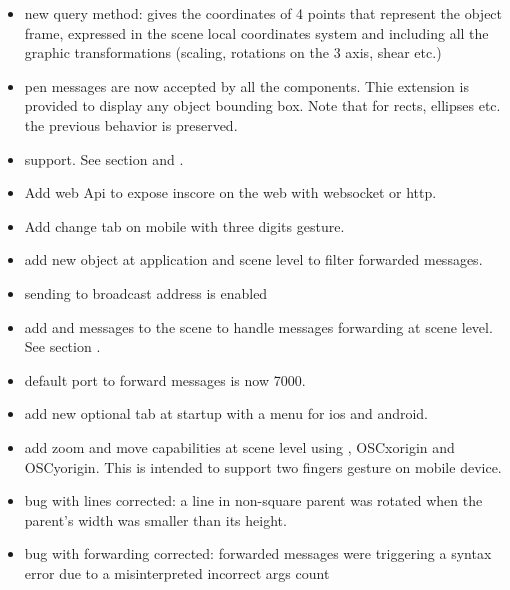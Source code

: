 \begin{itemize}
\item new  query method:  gives the coordinates of 4 points that represent the 
  object frame, expressed in the scene local coordinates system and including all the graphic 
  transformations (scaling, rotations on the 3 axis, shear etc.)
\item pen messages are now accepted by all the components. Thie extension is provided to display
  any object bounding box. Note that for rects, ellipses etc. the previous behavior is preserved.
\item {} support. See section  and .
\item Add web Api to expose inscore on the web with websocket or http.
\item Add change tab on mobile with three digits gesture.
\item add new object  at application and scene level to filter forwarded messages.
\item sending to broadcast address is enabled
\item add  and  messages to the scene to handle messages forwarding at scene level. See section .
\item default port to forward messages is now 7000.
\item add new optional tab at startup with a menu for ios and android.
\item add zoom and move capabilities at scene level using , OSC{xorigin} and OSC{yorigin}. This is intended to support two fingers gesture on mobile device.
\item bug with lines corrected: a line in non-square parent was rotated when the parent's width 
  was smaller than its height.
\item bug with  forwarding corrected: forwarded messages were triggering a syntax error due to 
  a misinterpreted incorrect args count 
\end{itemize}



